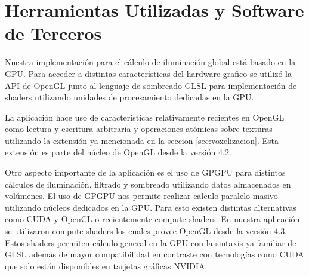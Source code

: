 \section{Herramientas Utilizadas y Software de Terceros}
Nuestra implementación para el cálculo de iluminación global está basado en la \ac{GPU}. Para acceder a distintas características del hardware grafico se utilizó la API de OpenGL junto al lenguaje de sombreado GLSL para implementación de shaders utilizando unidades de procesamiento dedicadas en la \ac{GPU}. 

La aplicación hace uso de características relativamente recientes en OpenGL como lectura y escritura arbitraria y operaciones atómicas sobre texturas utilizando la extensión ya mencionada en la seccion \ref{sec:voxelizacion}. Esta extensión es parte del núcleo de OpenGL desde la versión 4.2. 

Otro aspecto importante de la aplicación es el uso de \ac{GPGPU} para distintos cálculos de iluminación, filtrado y sombreado utilizando datos almacenados en volúmenes. El uso de \ac{GPGPU} nos permite realizar calculo paralelo masivo utilizando núcleos dedicados en la \ac{GPU}. Para esto existen distintas alternativas como CUDA y OpenCL o recientemente compute shaders. En nuestra aplicación se utilizaron compute shaders los cuales provee OpenGL desde la versión 4.3. Estos shaders permiten cálculo general en la GPU con la sintaxis ya familiar de GLSL además de mayor compatibilidad en contraste con tecnologías como CUDA que solo están disponibles en tarjetas gráficas NVIDIA.
